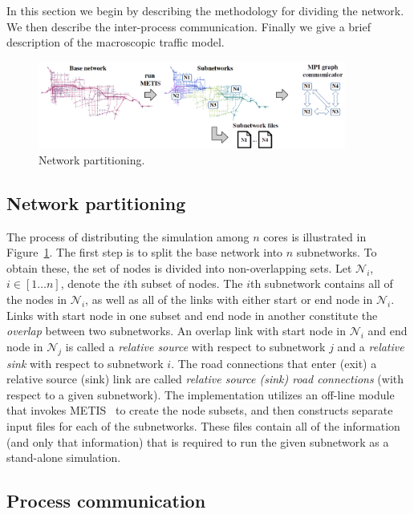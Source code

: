 In this section we begin by describing the methodology for dividing the network. We then describe the inter-process communication. Finally we give a brief description of the macroscopic traffic model. 

\begin{figure}
\centering
  \includegraphics[width=0.9\textwidth]{figs/splitter.png}
  \caption{Network partitioning.}
  \label{fig:partition}
\end{figure}

\subsection{Network partitioning}
The process of distributing the simulation among $n$ cores is illustrated in Figure~\ref{fig:partition}. The first step is to split the base network into $n$ subnetworks. To obtain these, the set of nodes is divided into non-overlapping sets. Let $\mathcal{N}_i$, $i\in[1\hdots n]$, denote the $i$th subset of nodes. The $i$th subnetwork contains all of the nodes in $\mathcal{N}_i$, as well as all of the links with either start or end node in $\mathcal{N}_i$. 
Links with start node in one subset and end node in another constitute the \textit{overlap} between two subnetworks. An overlap link with start node in $\mathcal{N}_i$ and end node in $\mathcal{N}_j$ is called a \textit{relative source} with respect to subnetwork $j$ and a \textit{relative sink} with respect to subnetwork $i$. The road connections that enter (exit) a relative source (sink) link are called \textit{relative source (sink) road connections} (with respect to a given subnetwork). The implementation utilizes an off-line module that invokes METIS~\cite{kaku:98a} to create the node subsets, and then constructs separate input files for each of the subnetworks. These files contain all of the information (and only that information) that is required to run the given subnetwork as a stand-alone simulation. 

\subsection{Process communication}

